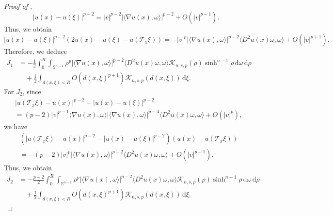 \documentclass[11pt]{amsart}
\theoremstyle{plain}
\theoremstyle{definition}
\numberwithin{equation}{section}
\begin{document}
\begin{proof} [Proof of ]
\begin{equation*}
|u(x) - u(\xi)|^{p-2} = |v|^{p-2} |\langle \nabla u(x), \omega \rangle|^{p-2} + O(|v|^{p-1}).
\end{equation*}
Thus, we obtain
\begin{equation*}
|u(x)-u(\xi)|^{p-2}(2u(x)-u(\xi)-u(\mathcal{T}_{x}\xi)) = -|v|^{p} |\langle \nabla u(x), \omega \rangle|^{p-2} \langle D^{2}u(x) \omega, \omega \rangle + O(|v|^{p+1}).
\end{equation*}
Therefore, we deduce
\begin{equation} \label{eq:J-1}
\begin{split}
J_{1}
&= -\frac{1}{2} \int_{0}^{R} \int_{\mathbb{S}^{n-1}} \rho^{p} |\langle \nabla u(x), \omega \rangle|^{p-2} \langle D^{2}u(x) \omega, \omega \rangle \mathcal{K}_{n,s,p}(\rho) \sinh^{n-1} \rho \, \mathrm{d}\omega \,\mathrm{d}\rho \\
&\quad + \frac{1}{2} \int_{d(x, \xi)<R} O(d(x, \xi)^{p+1}) \mathcal{K}_{n,s,p}(d(x, \xi)) \,\mathrm{d}\xi.
\end{split}
\end{equation}
For $J_{2}$, since
\begin{equation*}
\begin{split}
&|u(\mathcal{T}_{x}\xi)-u(x)|^{p-2} - |u(x)-u(\xi)|^{p-2} \\
&= (p-2)|v|^{p-1} \langle \nabla u(x), \omega \rangle |\langle \nabla u(x), \omega \rangle|^{p-4} \langle D^{2}u(x) \omega, \omega \rangle + O(|v|^{p}),
\end{split}
\end{equation*}
we have
\begin{equation*}
\begin{split}
&\left( |u(\mathcal{T}_{x}\xi)-u(x)|^{p-2} - |u(x)-u(\xi)|^{p-2} \right)(u(x)-u(\mathcal{T}_{x}\xi)) \\
&= -(p-2)|v|^{p} |\langle \nabla u(x), \omega \rangle|^{p-2} \langle D^{2}u(x) \omega, \omega \rangle + O(|v|^{p+1}).
\end{split}
\end{equation*}
Thus, we obtain
\begin{equation} \label{eq:J-2}
\begin{split}
J_{2} 
&= -\frac{p-2}{2} \int_{0}^{R} \int_{\mathbb{S}^{n-1}} \rho^{p} |\langle \nabla u(x), \omega \rangle|^{p-2} \langle D^{2}u(x) \omega, \omega \rangle \mathcal{K}_{n,s,p}(\rho) \sinh^{n-1} \rho \, \mathrm{d}\omega \,\mathrm{d}\rho \\
&\quad + \frac{1}{2} \int_{d(x, \xi)<R} O(d(x, \xi)^{p+1}) \mathcal{K}_{n,s,p}(d(x, \xi)) \,\mathrm{d}\xi.
\end{split}

\end{equation}
\end{proof}
\end{document}
